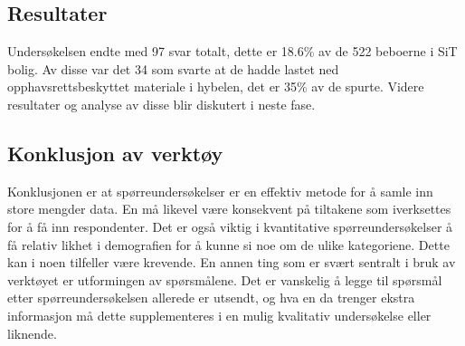\subsection{Resultater}
Undersøkelsen endte med 97 svar totalt, dette er 18.6\% av de 522 beboerne i SiT bolig. Av disse var det 34 som svarte at de hadde lastet ned opphavsrettsbeskyttet materiale i hybelen, det er 35\% av de spurte. Videre resultater og analyse av disse blir diskutert i neste fase. 

\subsection{Konklusjon av verktøy}
Konklusjonen er at spørreundersøkelser er en effektiv metode for å samle inn store mengder data. En må likevel være konsekvent på tiltakene som iverksettes for å få inn respondenter. Det er også viktig i kvantitative spørreundersøkelser å få relativ likhet i demografien for å kunne si noe om de ulike kategoriene. Dette kan i noen tilfeller være krevende. En annen ting som er svært sentralt i bruk av verktøyet er utformingen av spørsmålene. Det er vanskelig å legge til spørsmål etter spørreundersøkelsen allerede er utsendt, og hva en da trenger ekstra informasjon må dette supplementeres i en mulig kvalitativ undersøkelse eller liknende. 